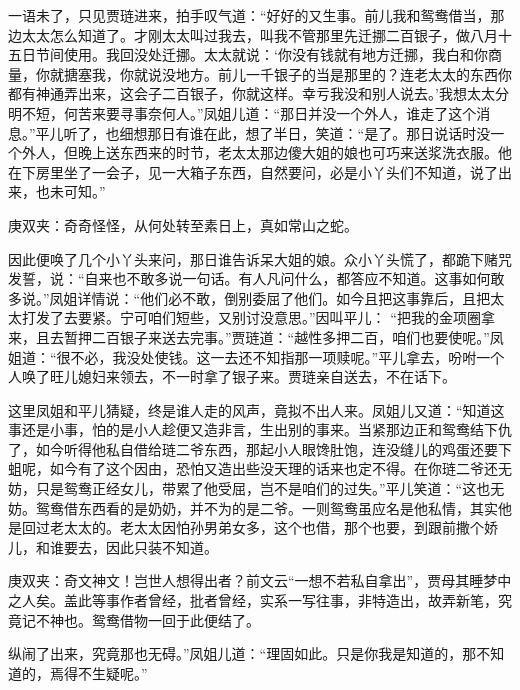 \begin{parag}
    一语未了，只见贾琏进来，拍手叹气道：“好好的又生事。前儿我和鸳鸯借当，那边太太怎么知道了。才刚太太叫过我去，叫我不管那里先迁挪二百银子，做八月十五日节间使用。我回没处迁挪。太太就说：‘你没有钱就有地方迁挪，我白和你商量，你就搪塞我，你就说没地方。前儿一千银子的当是那里的？连老太太的东西你都有神通弄出来，这会子二百银子，你就这样。幸亏我没和别人说去。’我想太太分明不短，何苦来要寻事奈何人。”凤姐儿道：“那日并没一个外人，谁走了这个消息。”平儿听了，也细想那日有谁在此，想了半日，笑道：“是了。那日说话时没一个外人，但晚上送东西来的时节，老太太那边傻大姐的娘也可巧来送浆洗衣服。他在下房里坐了一会子，见一大箱子东西，自然要问，必是小丫头们不知道，说了出来，也未可知。”\begin{note}庚双夹：奇奇怪怪，从何处转至素日上，真如常山之蛇。\end{note}因此便唤了几个小丫头来问，那日谁告诉呆大姐的娘。众小丫头慌了，都跪下赌咒发誓，说：“自来也不敢多说一句话。有人凡问什么，都答应不知道。这事如何敢多说。”凤姐详情说：“他们必不敢，倒别委屈了他们。如今且把这事靠后，且把太太打发了去要紧。宁可咱们短些，又别讨没意思。”因叫平儿： “把我的金项圈拿来，且去暂押二百银子来送去完事。”贾琏道：“越性多押二百，咱们也要使呢。”凤姐道：“很不必，我没处使钱。这一去还不知指那一项赎呢。”平儿拿去，吩咐一个人唤了旺儿媳妇来领去，不一时拿了银子来。贾琏亲自送去，不在话下。
\end{parag}


\begin{parag}
    这里凤姐和平儿猜疑，终是谁人走的风声，竟拟不出人来。凤姐儿又道：“知道这事还是小事，怕的是小人趁便又造非言，生出别的事来。当紧那边正和鸳鸯结下仇了，如今听得他私自借给琏二爷东西，那起小人眼馋肚饱，连没缝儿的鸡蛋还要下蛆呢，如今有了这个因由，恐怕又造出些没天理的话来也定不得。在你琏二爷还无妨，只是鸳鸯正经女儿，带累了他受屈，岂不是咱们的过失。”平儿笑道：“这也无妨。鸳鸯借东西看的是奶奶，并不为的是二爷。一则鸳鸯虽应名是他私情，其实他是回过老太太的。老太太因怕孙男弟女多，这个也借，那个也要，到跟前撒个娇儿，和谁要去，因此只装不知道。\begin{note}庚双夹：奇文神文！岂世人想得出者？前文云“一想不若私自拿出”，贾母其睡梦中之人矣。盖此等事作者曾经，批者曾经，实系一写往事，非特造出，故弄新笔，究竟记不神也。鸳鸯借物一回于此便结了。\end{note}纵闹了出来，究竟那也无碍。”凤姐儿道：“理固如此。只是你我是知道的，那不知道的，焉得不生疑呢。”
\end{parag}



